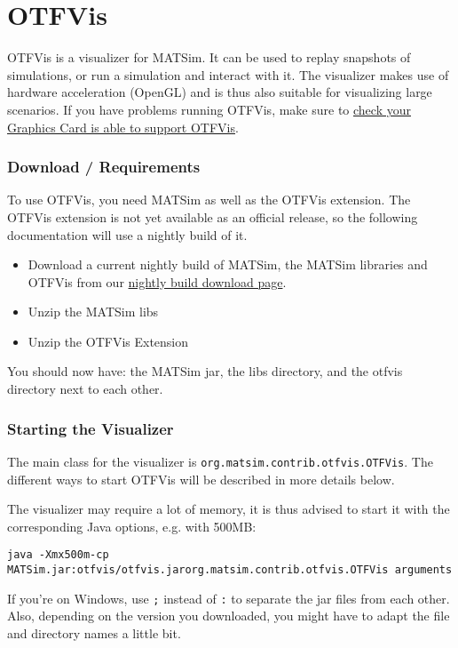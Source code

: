 \section{OTFVis}

OTFVis  is a visualizer for MATSim. It can be used to replay snapshots of  simulations, or run a simulation and interact with it. The visualizer  makes use of hardware acceleration (OpenGL) and is thus also suitable  for visualizing large scenarios. If you have problems running OTFVis,  make sure to \href{http://www.matsim.org/docs/extensions/otfvis/opengl}{check your Graphics Card is able to support OTFVis}.

\subsubsection{Download / Requirements}

To use OTFVis, you need MATSim as well as the OTFVis extension. The  OTFVis extension is not yet available as an official release, so the  following documentation will use a nightly build of it.
\begin{itemize}
	\item Download a current nightly build of MATSim, the MATSim libraries and OTFVis from our \href{http://www.matsim.org/files/builds}{nightly build download page}.
	\item Unzip the MATSim libs
	\item Unzip the OTFVis Extension
\end{itemize}

You should now have: the MATSim jar, the libs directory, and the otfvis directory next to each other.

\subsubsection{Starting the Visualizer}

The main class for the visualizer is 
\texttt{org.matsim.contrib.otfvis.OTFVis}. The different ways to start OTFVis will be described in more details below.

The visualizer may require a lot of memory, it is thus advised to start it with the corresponding Java options, e.g. with 500MB:
\begin{verbatim}
java -Xmx500m-cp MATSim.jar:otfvis/otfvis.jarorg.matsim.contrib.otfvis.OTFVis arguments
\end{verbatim}

If you're on Windows, use 
\texttt{;} instead of 
\texttt{:} to  separate the jar files from each other. Also, depending on the version  you downloaded, you might have to adapt the file and directory names a  little bit.  

